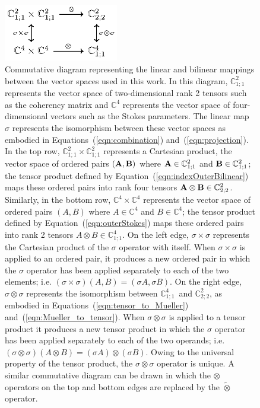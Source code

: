 \documentclass[twocolumn]{aastex6}
\newcommand{\Eqn}[1]{Equation~(\ref{eqn:#1})}
\newcommand{\Eqns}[3]{Equations~(\ref{eqn:#1}) #2~(\ref{eqn:#3})}
\newcommand{\rankfour}{\ensuremath{\mathbb{C}^2_{2;2}}}
\newcommand{\ranktwo}{\ensuremath{\mathbb{C}^4_{1;1}}}
\newcommand{\stimes}{\ensuremath{\tilde{\otimes}}}
\begin{document}
\begin{figure}
\centerline{\includegraphics[width=50mm]{commutative.eps}}
\caption{\label{fig:commutative}
%
Commutative diagram representing the linear and bilinear mappings
between the vector spaces used in this work.  In this diagram,
$\mathbb{C}^2_{1;1}$ represents the vector space of two-dimensional
rank 2 tensors such as the coherency matrix and $\mathbb{C}^4$
represents the vector space of four-dimensional vectors such as the
Stokes parameters.
%
The linear map $\sigma$ represents the isomorphism between these
vector spaces as embodied in \Eqns{combination}{and}{projection}.
%
In the top row, $\mathbb{C}^2_{1;1}\times\mathbb{C}^2_{1;1}$
represents a Cartesian product, the vector space of ordered pairs
$\left({\bf A}, {\bf B}\right)$ where ${\bf A}\in\mathbb{C}^2_{1;1}$
and ${\bf B}\in\mathbb{C}^2_{1;1}$; the tensor product defined by
\Eqn{indexOuterBilinear} maps these ordered pairs into rank four
tensors ${\bf A}\otimes{\bf B}\in\rankfour$.
%
Similarly, in the bottom row, $\mathbb{C}^4\times\mathbb{C}^4$
represents the vector space of ordered pairs $\left(A, B\right)$ where
$A\in\mathbb{C}^4$ and $B\in\mathbb{C}^4$; the tensor product defined
by \Eqn{outerStokes} maps these ordered pairs into rank 2 tensors
$A\otimes B\in\ranktwo$.
%
On the left edge, $\sigma\times\sigma$ represents the Cartesian
product of the $\sigma$ operator with itself.  When
$\sigma\times\sigma$ is applied to an ordered pair, it produces a new
ordered pair in which the $\sigma$ operator has been applied
separately to each of the two elements; i.e.
%
$\left(\sigma\times\sigma\right)\left(A,B\right)
   = \left(\sigma A,\sigma B\right)$.
%
On the right edge, $\sigma\otimes\sigma$ represents the isomorphism
between \ranktwo\ and \rankfour, as embodied in
\Eqns{tensor_to_Mueller}{and}{Mueller_to_tensor}.
When $\sigma\otimes\sigma$ is applied to a tensor product it produces
a new tensor product in which the $\sigma$ operator has been applied
separately to each of the two operands; i.e.
%
$\left(\sigma\otimes\sigma\right)\left(A\otimes B\right)
   = \left(\sigma A\right)\otimes\left(\sigma B\right)$.
%
Owing to the universal property of the tensor product, the
$\sigma\otimes\sigma$ operator is unique.  A similar commutative
diagram can be drawn in which the $\otimes$ operators on the top and
bottom edges are replaced by the $\stimes$ operator.}
\end{figure}
\end{document}
